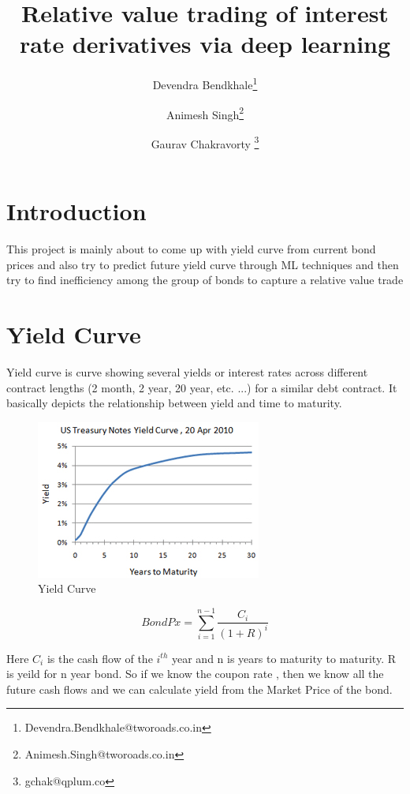 \documentclass[a4paper]{article}
\author[1]{Devendra Bendkhale\thanks{Devendra.Bendkhale@tworoads.co.in}}
\author[1]{Animesh Singh\thanks{Animesh.Singh@tworoads.co.in}}
\author[1]{Gaurav Chakravorty \thanks{gchak@qplum.co}}
\affil[1]{qplum Investment Research}
\title{Relative value trading of interest rate derivatives via deep learning}
\date{}
\begin{document}
\maketitle

\section{Introduction}
This project is mainly about to come up with yield curve from current bond prices and also try to predict future yield curve through ML techniques and then try to find inefficiency among the group of bonds to capture a relative value trade


\section{Yield Curve}
Yield curve is curve showing  several yields or interest rates across different contract lengths (2 month, 2 year, 20 year, etc. ...) for a similar debt contract. It basically depicts the relationship between yield and time to maturity. 
            

\begin{figure}[h!]
\centering
\includegraphics[scale=0.9]{us-treasury-yield.png}
\caption{Yield Curve}
\label{fig:univerise}
\end{figure}
 

\[BondPx
  =\sum_{i=1}^{n-1}\dfrac{C_{i}}{(1+R)^{i}}
\]

Here $C_i$ is the cash flow of the $i^{th}$ year and n is years to maturity to maturity. R is yeild for n year bond. So if we know the coupon rate , then we know all the future cash flows and we can calculate yield from the Market Price of the bond.

 
\end{document}
